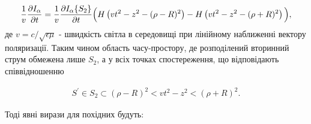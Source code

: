 \begin{equation*} \begin{aligned}
\frac{1}{v} \frac{\partial I_\alpha}{\partial t} = 
\frac{1}{v} \frac{\partial  I_\alpha \{ S_{2} \} }{\partial t} 
\Big( H \left( vt^2 - z^2 - (\rho - R)^2 \right)  - 
H \left( vt^2 - z^2 - (\rho + R)^2 \right) \Big),
\end{aligned} \end{equation*}
%
де $ v = c/\sqrt{\epsilon \mu} $ - швидкість світла в середовищі при 
лінійному наближенні вектору поляризації. Таким чином область часу-простору,
де розподілений вторинний струм обмежена лише $ S_2 $, а у всіх точках 
спостереження, що відповідають співвідношенню

\begin{equation*} \begin{aligned}
S^\prime \in S_2 \subset (\rho-R)^2 < vt^2 - z^2 < (\rho+R)^2.
\end{aligned} \end{equation*}

Тоді явні вирази для похідних будуть:

